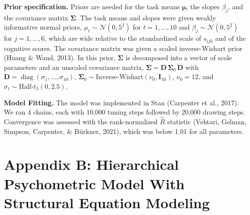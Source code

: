 \documentclass[
  ,man]{apa6}
\begin{document}
\textbf{Prior specification.} Priors are needed for the task means \(\boldsymbol{\mu}\), the slopes \(\beta_j\), and the covariance matrix \(\boldsymbol{\Sigma}\). The task means and slopes were given weakly informative normal priors,
\(\mu_t \sim \mathcal{N}(0, 5^2)\) for \(t = 1, \ldots, 10\) and \(\beta_j \sim \mathcal{N}(0, 5^2)\) for \(j = 1, \ldots, 6\), which are wide relative to the standardized scale of \(s_{ijk}\) and of the cognitive scores. The covariance matrix was given a scaled inverse-Wishart prior (Huang \& Wand, 2013). In this prior, \(\boldsymbol{\Sigma}\) is decomposed into a vector of scale parameters and an unscaled covariance matrix, \(\boldsymbol{\Sigma} = \mathbf{D}\,\boldsymbol{\Sigma}_0\,\mathbf{D}\) with \(\mathbf{D} = \operatorname{diag}(\sigma_1, \ldots, \sigma_{10})\), \(\boldsymbol{\Sigma}_0 \sim \text{Inverse-Wishart}(\nu_0, \mathbf{I}_{10})\), \(\nu_0 = 12\), and \(\sigma_t \sim \text{Half-}t_3(0, 2.5)\).

\textbf{Model Fitting.} The model was implemented in Stan (Carpenter et al., 2017). We ran 4 chains, each with 10,000 tuning steps followed by 20,000 drawing steps. Convergence was assessed with the rank-normalized \(\hat{R}\) statistic (Vehtari, Gelman, Simpson, Carpenter, \& Bürkner, 2021), which was below 1.01 for all parameters.

\section{Appendix B: Hierarchical Psychometric Model With Structural Equation Modeling}\label{appendix-b-hierarchical-psychometric-model-with-structural-equation-modeling}
\end{document}
